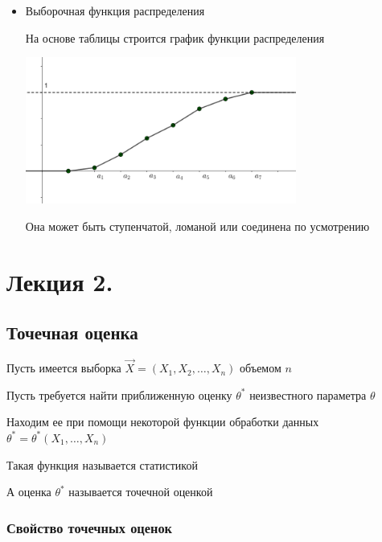 \documentclass[12pt]{article}
\begin{document}
\begin{itemize}
    \item Выборочная функция распределения

    На основе таблицы строится график функции распределения

    \begin{center}
        \includegraphics[width=0.7\textwidth]{mathstat/images/mathstat_2025_02_11_3}
    \end{center}

    Она может быть ступенчатой, ломаной или соединена по усмотрению

\end{itemize}











\section{Лекция 2.}

\subsection{Точечная оценка}

\hypertarget{point_estimation}{}

Пусть имеется выборка $\vec{X} = (X_1, X_2, \dots, X_n)$ объемом $n$

Пусть требуется найти приближенную оценку $\theta^*$ неизвестного параметра $\theta$

Находим ее при помощи некоторой функции обработки данных $\theta^* = \theta^*(X_1, \dots, X_n)$

\Def Такая функция называется статистикой

\Defs А оценка $\theta^*$ называется точечной оценкой

\subsubsection{Свойство точечных оценок}
\end{document}
